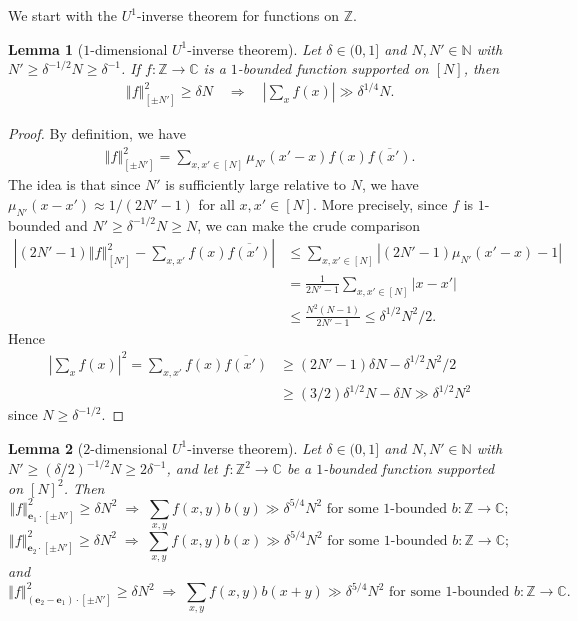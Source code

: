 \documentclass[11pt]{amsart}
\newtheorem{lemma}{Lemma}[section]
\theoremstyle{definition}
\newcommand{\C}{{\mathbb C}}
\newcommand{\N}{{\mathbb N}}
\newcommand{\Z}{{\mathbb Z}}
\newcommand{\be}{{\mathbf{e}}}
\newcommand{\norm}[1]{\left\Vert #1\right\Vert}
\newcommand{\abs}[1]{\mathopen{}\left| #1\mathclose{}\right|}
\begin{document}
We start with the $U^1$-inverse theorem for functions on $\Z$.
\begin{lemma}[$1$-dimensional $U^1$-inverse theorem]\label{L: 1-dim U^1 inverse}
    Let $\delta\in(0, 1]$ and $N, N'\in\N$ with $N'\geq \delta^{-1/2} N\geq \delta^{-1}$.  If $f: \Z \to \mathbb{C}$ is a $1$-bounded function supported on $[N]$, then
    \begin{gather*}
        \norm{f}_{[\pm N']}^2\geq \delta N \quad \Longrightarrow\quad \abs{\sum_{x}f(x)}\gg\delta^{1/4} N.
    \end{gather*}
\end{lemma}
\begin{proof}
By definition, we have
\begin{align*}
    \norm{f}_{[\pm N']}^2 = \sum_{x,x'\in[N]}\mu_{N'}(x'-x)f(x)\overline{f(x')}.
\end{align*}
The idea is that since $N'$ is sufficiently large relative to $N$, we have $\mu_{N'}(x-x') \approx 1/(2N'-1)$ for all $x,x'\in[N]$.  More precisely, since $f$ is $1$-bounded and $N' \geq \delta^{-1/2}N \geq N$, we can make the crude comparison
\begin{align*}
\abs{(2N'-1)\norm{f}_{[N']}^2 -\sum_{x,x'}f(x)\overline{f(x')}} &\leq \sum_{x,x'\in[N]}\abs{(2N'-1)\mu_{N'}(x'-x)-1}\\
 &=\frac{1}{2N'-1} \sum_{x,x' \in [N]} |x-x'|\\
 & \leq \frac{N^2(N-1)}{2N'-1} \leq \delta^{1/2} N^2/2.
\end{align*}
Hence
\begin{align*}
\abs{\sum_x f(x)}^2=\sum_{x,x'} f(x) \overline{f(x')} &\geq (2N'-1) \delta N-\delta^{1/2} N^2/2\\
&\geq(3/2)\delta^{1/2}N - \delta N\gg \delta^{1/2}N^2
\end{align*}
since $N\geq\delta^{-1/2}$.
\end{proof}


\begin{lemma}[$2$-dimensional $U^1$-inverse theorem]\label{L: U^1 inverse}
    Let $\delta\in(0, 1]$ and $N, N'\in\N$ with $N'\geq (\delta/2)^{-1/2} N\geq 2\delta^{-1}$, and let $f: \Z^2 \to \mathbb{C}$ be a $1$-bounded function supported on $[N]^2$.  Then
    $$\norm{f}^2_{\be_1\cdot[\pm N']}\geq \delta N^2 \; \Longrightarrow \; \text{$\sum_{x,y}f(x,y)b(y)\gg \delta^{5/4} N^2$ for some $1$-bounded $b:\Z\to\C$};$$
     $$\norm{f}_{\be_2\cdot[\pm N']}^2\geq \delta N^2 \; \Longrightarrow \; \text{$\sum_{x,y}f(x,y)b(x)\gg \delta^{5/4} N^2$ for some $1$-bounded $b:\Z\to\C$};$$
and
 $$\norm{f}^2_{(\be_2-\be_1)\cdot[\pm N']}\geq \delta N^2 \; \Longrightarrow \; \text{$\sum_{x,y}f(x,y)b(x+y)\gg \delta^{5/4} N^2$ for some $1$-bounded $b:\Z\to\C$}.$$
\end{lemma}
\end{document}
